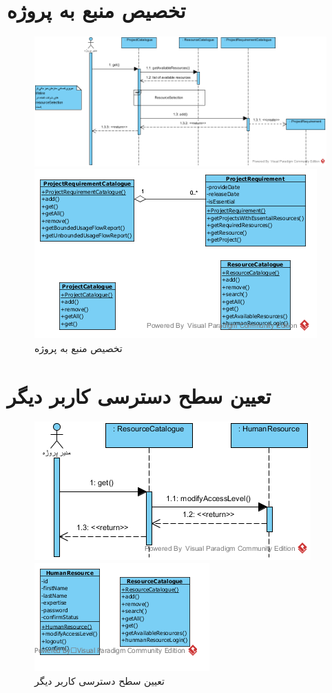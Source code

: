 \section{تخصیص منبع به پروژه}
\begin{figure}[H]
	\centering
	\includegraphics[scale=0.7]{img/sequence-analysis/AllocateResourceToProject}
	
	
	\includegraphics[scale=0.8]{img/sequence-analysis/AllocateResourceToProjectC}
	\caption{تخصیص منبع به پروژه}
\end{figure}

\section{تعیین سطح دسترسی کاربر دیگر}
\begin{figure}[H]
	\centering
	\includegraphics[scale=1]{img/sequence-analysis/SetUserAccessLevel}
	
	
	\includegraphics[scale=1]{img/sequence-analysis/SetUserAccessLevelC}
		\caption{تعیین سطح دسترسی کاربر دیگر}
\end{figure}


